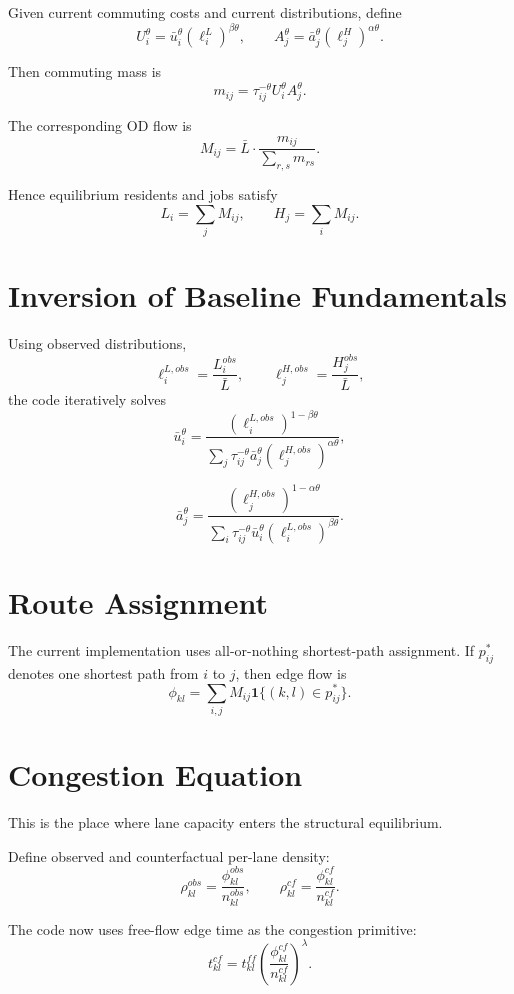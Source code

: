 \documentclass[11pt]{article}
\begin{document}
Given current commuting costs and current distributions, define
\[
U_i^\theta = \bar u_i^\theta (\ell_i^L)^{\beta\theta},
\qquad
A_j^\theta = \bar a_j^\theta (\ell_j^H)^{\alpha\theta}.
\]

Then commuting mass is
\[
m_{ij} = \tau_{ij}^{-\theta} U_i^\theta A_j^\theta.
\]

The corresponding OD flow is
\[
M_{ij}
=
\bar L \cdot \frac{m_{ij}}{\sum_{r,s} m_{rs}}.
\]

Hence equilibrium residents and jobs satisfy
\[
L_i = \sum_j M_{ij},
\qquad
H_j = \sum_i M_{ij}.
\]

\section{Inversion of Baseline Fundamentals}

Using observed distributions,
\[
\ell_i^{L,obs} = \frac{L_i^{obs}}{\bar L},
\qquad
\ell_j^{H,obs} = \frac{H_j^{obs}}{\bar L},
\]
the code iteratively solves
\[
\bar u_i^\theta
=
\frac{(\ell_i^{L,obs})^{1-\beta\theta}}
{\sum_j \tau_{ij}^{-\theta}\bar a_j^\theta(\ell_j^{H,obs})^{\alpha\theta}},
\]

\[
\bar a_j^\theta
=
\frac{(\ell_j^{H,obs})^{1-\alpha\theta}}
{\sum_i \tau_{ij}^{-\theta}\bar u_i^\theta(\ell_i^{L,obs})^{\beta\theta}}.
\]

\section{Route Assignment}

The current implementation uses all-or-nothing shortest-path assignment.
If $p_{ij}^*$ denotes one shortest path from $i$ to $j$, then edge flow is
\[
\phi_{kl}
=
\sum_{i,j} M_{ij}\mathbf 1\{(k,l)\in p_{ij}^*\}.
\]

\section{Congestion Equation}

This is the place where lane capacity enters the structural equilibrium.

Define observed and counterfactual per-lane density:
\[
\rho_{kl}^{obs} = \frac{\phi_{kl}^{obs}}{n_{kl}^{obs}},
\qquad
\rho_{kl}^{cf} = \frac{\phi_{kl}^{cf}}{n_{kl}^{cf}}.
\]

The code now uses free-flow edge time as the congestion primitive:
\[
t_{kl}^{cf}
=
t_{kl}^{ff}
\left(
\frac{\phi_{kl}^{cf}}{n_{kl}^{cf}}
\right)^{\lambda}.
\]
\end{document}
